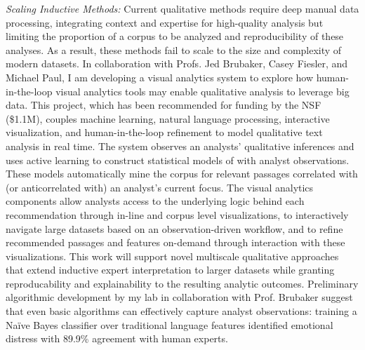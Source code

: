\documentclass[11pt]{article}
\begin{document}
\emph{Scaling Inductive Methods:} Current qualitative methods require deep manual data processing, integrating context and expertise for high-quality analysis but limiting the proportion of a corpus to be analyzed and reproducibility of these analyses. As a result, these methods fail to scale to the size and complexity of modern datasets. 
In collaboration with Profs. Jed Brubaker, Casey Fiesler, and Michael Paul, I am developing a visual analytics system to explore how human-in-the-loop visual analytics tools may enable qualitative analysis to leverage big data.  This project, which has been recommended for funding by the NSF (\$1.1M), couples machine learning, natural language processing, interactive visualization, and human-in-the-loop refinement to model qualitative text analysis in real time. The system observes an analysts' qualitative inferences and uses active learning to construct statistical models of with analyst observations. These models automatically mine the corpus for relevant passages correlated with (or anticorrelated with) an analyst's current focus. The visual analytics components allow analysts access to the underlying logic behind each recommendation through in-line and corpus level visualizations, to interactively navigate large datasets based on an observation-driven workflow, and to refine recommended passages and features on-demand through interaction with these visualizations.
This work will support novel multiscale qualitative approaches that extend inductive expert interpretation to larger datasets while granting reproducability and explainability to the resulting analytic outcomes.
Preliminary algorithmic development by my lab in collaboration with Prof. Brubaker suggest that even basic algorithms can effectively capture analyst observations: training a Na\"ive Bayes classifier over traditional language features identified emotional distress with 89.9\% agreement with human experts.
\end{document}
